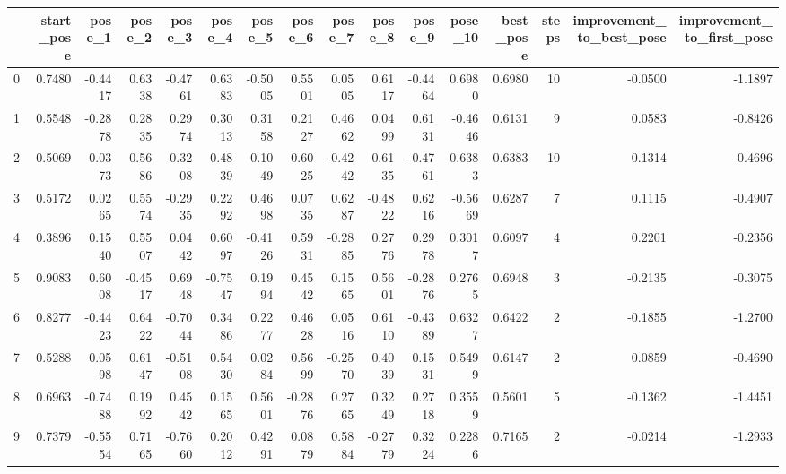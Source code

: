 \begin{tabular}{lrrrrrrrrrrrrrrr}
\toprule
{} &  start\_pose &  pose\_1 &  pose\_2 &  pose\_3 &  pose\_4 &  pose\_5 &  pose\_6 &  pose\_7 &  pose\_8 &  pose\_9 &  pose\_10 &  best\_pose &  steps &  improvement\_to\_best\_pose &  improvement\_to\_first\_pose \\
\midrule
0  &      0.7480 & -0.4417 &  0.6338 & -0.4761 &  0.6383 & -0.5005 &  0.5501 &  0.0505 &  0.6117 & -0.4464 &   0.6980 &     0.6980 &     10 &                   -0.0500 &                    -1.1897 \\
1  &      0.5548 & -0.2878 &  0.2835 &  0.2974 &  0.3013 &  0.3158 &  0.2127 &  0.4662 &  0.0499 &  0.6131 &  -0.4646 &     0.6131 &      9 &                    0.0583 &                    -0.8426 \\
2  &      0.5069 &  0.0373 &  0.5686 & -0.3208 &  0.4839 &  0.1049 &  0.6025 & -0.4242 &  0.6135 & -0.4761 &   0.6383 &     0.6383 &     10 &                    0.1314 &                    -0.4696 \\
3  &      0.5172 &  0.0265 &  0.5574 & -0.2935 &  0.2292 &  0.4698 &  0.0735 &  0.6287 & -0.4822 &  0.6216 &  -0.5669 &     0.6287 &      7 &                    0.1115 &                    -0.4907 \\
4  &      0.3896 &  0.1540 &  0.5507 &  0.0442 &  0.6097 & -0.4126 &  0.5931 & -0.2885 &  0.2776 &  0.2978 &   0.3017 &     0.6097 &      4 &                    0.2201 &                    -0.2356 \\
5  &      0.9083 &  0.6008 & -0.4517 &  0.6948 & -0.7547 &  0.1994 &  0.4542 &  0.1565 &  0.5601 & -0.2876 &   0.2765 &     0.6948 &      3 &                   -0.2135 &                    -0.3075 \\
6  &      0.8277 & -0.4423 &  0.6422 & -0.7044 &  0.3486 &  0.2277 &  0.4628 &  0.0516 &  0.6110 & -0.4389 &   0.6327 &     0.6422 &      2 &                   -0.1855 &                    -1.2700 \\
7  &      0.5288 &  0.0598 &  0.6147 & -0.5108 &  0.5430 &  0.0284 &  0.5699 & -0.2570 &  0.4039 &  0.1531 &   0.5499 &     0.6147 &      2 &                    0.0859 &                    -0.4690 \\
8  &      0.6963 & -0.7488 &  0.1992 &  0.4542 &  0.1565 &  0.5601 & -0.2876 &  0.2765 &  0.3249 &  0.2718 &   0.3559 &     0.5601 &      5 &                   -0.1362 &                    -1.4451 \\
9  &      0.7379 & -0.5554 &  0.7165 & -0.7660 &  0.2012 &  0.4291 &  0.0879 &  0.5884 & -0.2779 &  0.3224 &   0.2286 &     0.7165 &      2 &                   -0.0214 &                    -1.2933 \\

\end{tabular}
